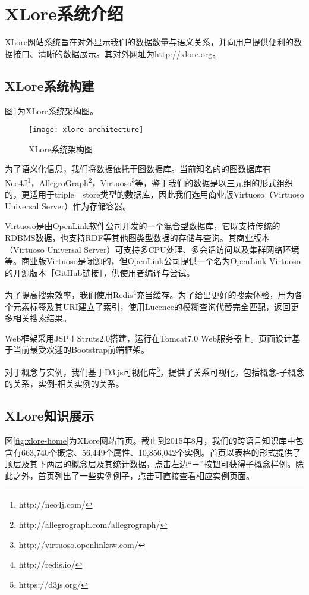 \section{XLore系统介绍}
\label{sec5:system-describe}
XLore网站系统旨在对外显示我们的数据数量与语义关系，并向用户提供便利的数据接口、清晰的数据展示。其对外网址为http://xlore.org。

\subsection{XLore系统构建}
图\ref{fig:xlore-architecture}为XLore系统架构图。

\begin{figure}[H] 
  \centering
  \texttt{[image: xlore-architecture]}
  \caption{XLore系统架构图}
  \label{fig:xlore-architecture}
\end{figure}

为了语义化信息，我们将数据依托于图数据库。当前知名的的图数据库有Neo4J\footnote{http://neo4j.com/}，AllegroGraph\footnote{http://allegrograph.com/allegrograph/}，Virtuoso\footnote{http://virtuoso.openlinksw.com/}等，鉴于我们的数据是以三元组的形式组织的，更适用于triple－store类型的数据库，因此我们选用商业版Virtuoso（Virtuoso Universal Server）作为存储容器。

Virtuoso是由OpenLink软件公司开发的一个混合型数据库，它既支持传统的RDBMS数据，也支持RDF等其他图类型数据的存储与查询。其商业版本（Virtuoso Universal Server）可支持多CPU处理、多会话访问以及集群网络环境等。商业版Virtuoso是闭源的，但OpenLink公司提供一个名为OpenLink Virtuoso的开源版本［GitHub链接］，供使用者编译与尝试。

为了提高搜索效率，我们使用Redis\footnote{http://redis.io/}充当缓存。为了给出更好的搜索体验，用为各个元素标签及其URI建立了索引，使用Lucence的模糊查询代替完全匹配，返回更多相关搜索结果。

Web框架采用JSP＋Struts2.0搭建，运行在Tomcat7.0 Web服务器上。页面设计基于当前最受欢迎的Bootstrap前端框架。

对于概念与实例，我们基于D3.js可视化库\footnote{https://d3js.org/}，提供了关系可视化，包括概念-子概念的关系，实例-相关实例的关系。

\subsection{XLore知识展示}
图\ref{fig:xlore-home}为XLore网站首页。截止到2015年8月，我们的跨语言知识库中包含有663,740个概念、56,449个属性、10,856,042个实例。首页以表格的形式提供了顶层及其下两层的概念层及其统计数据，点击左边“＋”按钮可获得子概念样例。除此之外，首页列出了一些实例例子，点击可直接查看相应实例页面。

